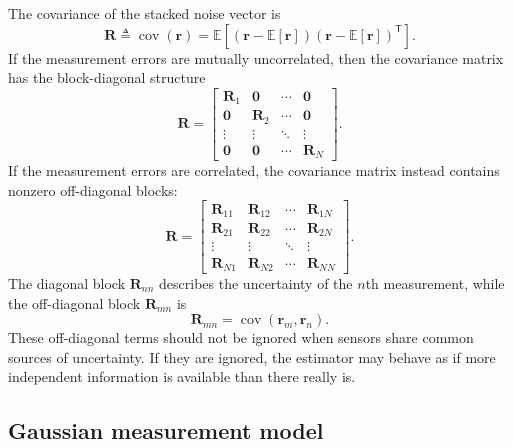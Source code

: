 \documentclass[graybox,envcountchap]{style/SNmono}
\begin{document}
The covariance of the stacked noise vector is
\begin{equation}
\mathbf{R}
\triangleq
\operatorname{cov}(\mathbf{r}) = \mathbb{E} \left[ \left( \mathbf{r}-\mathbb{E}[\mathbf{r}] \right) \left( \mathbf{r}-\mathbb{E}[\mathbf{r}] \right)^{\mathsf T} \right].
\end{equation}
If the measurement errors are mutually uncorrelated, then the covariance matrix has the block-diagonal structure
\begin{equation}
\mathbf{R}=
\begin{bmatrix}
\mathbf{R}_1 & \mathbf{0} & \cdots & \mathbf{0}\\
\mathbf{0} & \mathbf{R}_2 & \cdots & \mathbf{0}\\
\vdots & \vdots & \ddots & \vdots\\
\mathbf{0} & \mathbf{0} & \cdots & \mathbf{R}_N
\end{bmatrix}.
\end{equation}
If the measurement errors are correlated, the covariance matrix instead contains nonzero off-diagonal blocks:
\begin{equation}
\mathbf{R}
=
\begin{bmatrix}
\mathbf{R}_{11} & \mathbf{R}_{12} & \cdots & \mathbf{R}_{1N}\\
\mathbf{R}_{21} & \mathbf{R}_{22} & \cdots & \mathbf{R}_{2N}\\
\vdots & \vdots & \ddots & \vdots\\
\mathbf{R}_{N1} & \mathbf{R}_{N2} & \cdots & \mathbf{R}_{NN}
\end{bmatrix}.
\end{equation}
The diagonal block $\mathbf{R}_{nn}$ describes the uncertainty of the $n$th measurement, while the off-diagonal block $\mathbf{R}_{mn}$ is
\begin{equation}
\mathbf{R}_{mn} = \operatorname{cov}(\mathbf{r}_m,\mathbf{r}_n).
\end{equation}
These off-diagonal terms should not be ignored when sensors share common sources of uncertainty. If they are ignored, the estimator may behave as if more independent information is available than there really is.


\subsection{Gaussian measurement model}
\end{document}
